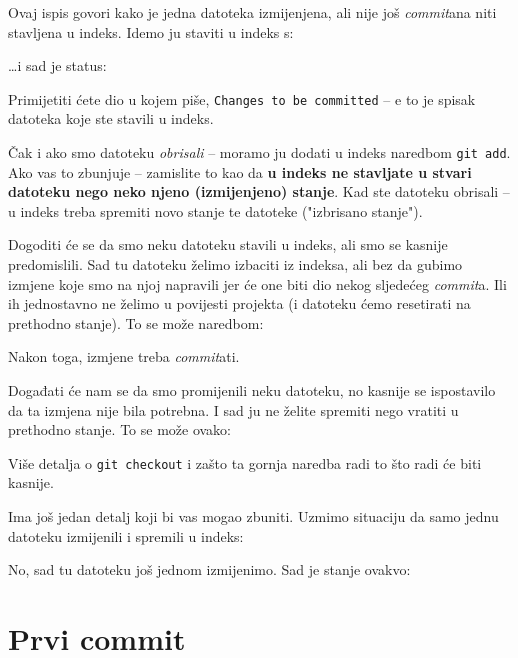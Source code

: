 

Ovaj ispis govori kako je jedna datoteka izmijenjena, ali nije još \emph{commit}ana niti stavljena u indeks.
Idemo ju staviti u indeks s:


\dots{}i sad je status:



Primijetiti ćete dio u kojem piše, \texttt{Changes to be committed} -- e to je spisak datoteka koje ste stavili u indeks.

Čak i ako smo datoteku \emph{obrisali} -- moramo ju dodati u indeks naredbom \verb+git add+.
Ako vas to zbunjuje -- zamislite to kao da \textbf{u indeks ne stavljate u stvari datoteku nego neko njeno (izmijenjeno) stanje}.
Kad ste datoteku obrisali -- u indeks treba spremiti novo stanje te datoteke ("izbrisano stanje").

Dogoditi će se da smo neku datoteku stavili u indeks, ali smo se kasnije predomislili. 
Sad tu datoteku želimo izbaciti iz indeksa, ali bez da gubimo izmjene koje smo na njoj napravili jer će one biti dio nekog sljedećeg \emph{commit}a.
Ili ih jednostavno ne želimo u povijesti projekta (i datoteku ćemo resetirati na prethodno stanje).
To se može naredbom:


Nakon toga, izmjene treba \emph{commit}ati.

Događati će nam se da smo promijenili neku datoteku, no kasnije se ispostavilo da ta izmjena nije bila potrebna. 
I sad ju ne želite spremiti nego vratiti u prethodno stanje.
To se može ovako:


Više detalja o \verb+git checkout+ i zašto ta gornja naredba radi to što radi će biti kasnije.

Ima još jedan detalj koji bi vas mogao zbuniti. 
Uzmimo situaciju da samo jednu datoteku izmijenili i spremili u indeks:



No, sad tu datoteku još jednom izmijenimo. 
Sad je stanje ovakvo:



\section*{Prvi commit}

